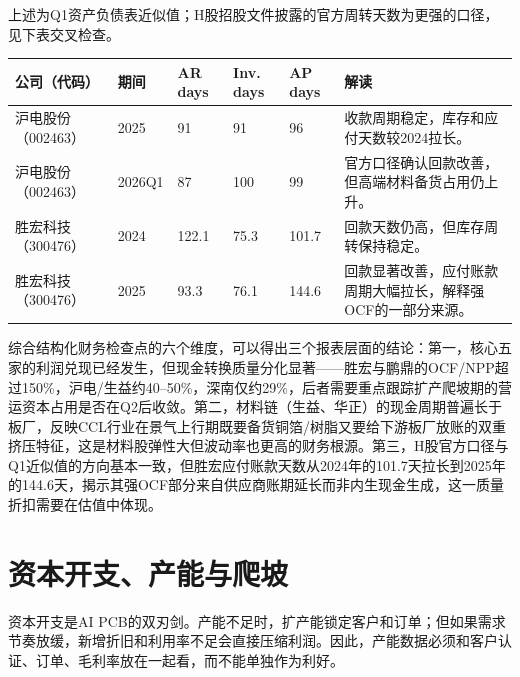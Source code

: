 上述为Q1资产负债表近似值；H股招股文件披露的官方周转天数为更强的口径，见下表交叉检查。

\begin{exhibitbox}[图表6-8：H股官方周转天数交叉检查]
\footnotesize
\begin{tabularx}{\textwidth}{L{1.8cm}L{1.6cm}R{1.5cm}R{1.5cm}R{1.5cm}X}
\toprule
\textbf{公司（代码）} & \textbf{期间} & \textbf{AR days} & \textbf{Inv. days} & \textbf{AP days} & \textbf{解读} \\
\midrule
沪电股份（002463） & 2025 & 91 & 91 & 96 & 收款周期稳定，库存和应付天数较2024拉长。 \\
沪电股份（002463） & 2026Q1 & 87 & 100 & 99 & 官方口径确认回款改善，但高端材料备货占用仍上升。 \\
胜宏科技（300476） & 2024 & 122.1 & 75.3 & 101.7 & 回款天数仍高，但库存周转保持稳定。 \\
胜宏科技（300476） & 2025 & 93.3 & 76.1 & 144.6 & 回款显著改善，应付账款周期大幅拉长，解释强OCF的一部分来源。 \\
\bottomrule
\end{tabularx}
\end{exhibitbox}

综合结构化财务检查点的六个维度，可以得出三个报表层面的结论：第一，核心五家的利润兑现已经发生，但现金转换质量分化显著——胜宏与鹏鼎的OCF/NPP超过150\%，沪电/生益约40--50\%，深南仅约29\%，后者需要重点跟踪扩产爬坡期的营运资本占用是否在Q2后收敛。第二，材料链（生益、华正）的现金周期普遍长于板厂，反映CCL行业在景气上行期既要备货铜箔/树脂又要给下游板厂放账的双重挤压特征，这是材料股弹性大但波动率也更高的财务根源。第三，H股官方口径与Q1近似值的方向基本一致，但胜宏应付账款天数从2024年的101.7天拉长到2025年的144.6天，揭示其强OCF部分来自供应商账期延长而非内生现金生成，这一质量折扣需要在估值中体现。

\section{资本开支、产能与爬坡}

资本开支是AI PCB的双刃剑。产能不足时，扩产能锁定客户和订单；但如果需求节奏放缓，新增折旧和利用率不足会直接压缩利润。因此，产能数据必须和客户认证、订单、毛利率放在一起看，而不能单独作为利好。


